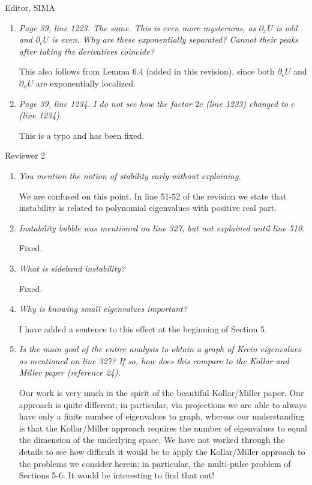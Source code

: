 \documentclass[11pt]{letter}
\begin{document}
\begin{letter}{Editor, SIMA}
\begin{enumerate}
\item \emph{Page 39, line 1223. The same. This is even more mysterious, as $\partial_x U$ is odd and $\partial_c U$ is even. Why are these exponentially separated? Cannot their peaks after taking the derivatives coincide?}
\vspace{4mm}

This also follows from Lemma 6.4 (added in this revision), since both $\partial_c U$ and $\partial_x U$ are exponentially localized.

\item \emph{Page 39, line 1234. I do not see how the factor $2c$ (line 1233) changed to $c$ (line 1234).}
\vspace{4mm}

This is a typo and has been fixed.

\end{enumerate}

Reviewer 2
\begin{enumerate}
\item \emph{You mention the notion of stability early without explaining.}
\vspace{4mm}

We are confused on this point. In line 51-52 of the revision we state that instability is related to polynomial eigenvalues with positive real part.

\item \emph{Instability bubble was mentioned on line 327, but not explained until line 510.}

Fixed.

\item \emph{What is sideband instability?}

Fixed.

\item \emph{Why is knowing small eigenvalues important?}

I have added a sentence to this effect at the beginning of Section 5.

\item \emph{Is the main goal of the entire analysis to obtain a graph of Krein eigenvalues as mentioned on line 327? If so, how does this compare to the Kollar and Miller paper (reference 24). }

Our work is very much in the spirit of the beautiful Kollar/Miller paper. Our approach is quite different; in particular, via projections we are able to always have only a finite number of eigenvalues to graph, whereas our understanding is that the Kollar/Miller approach requires the number of eigenvalues to equal the dimension of the underlying space. We have not worked through the details to see how difficult it would be to apply the Kollar/Miller approach to the problems we consider herein; in particular, the multi-pulse problem of Sections 5-6. It would be interesting to find that out!


\end{enumerate}
\end{letter}
\end{document}
